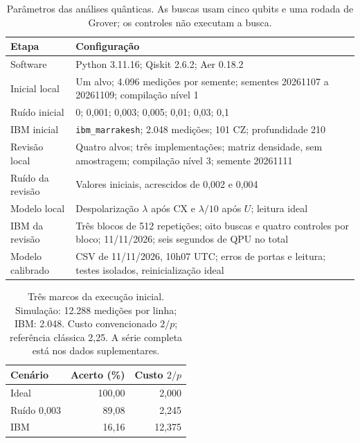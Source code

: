 \begin{table}[!ht]
\caption{Parâmetros das análises quânticas. As buscas usam cinco qubits e uma rodada de Grover; os controles não executam a busca.}
\label{tab:parametros}
\centering\small
\begin{tabularx}{\columnwidth}{@{}lX@{}}
\toprule
Etapa & Configuração \\
\midrule
Software & Python 3.11.16; Qiskit 2.6.2; Aer 0.18.2 \\
Inicial local & Um alvo; 4.096 medições por semente; sementes 20261107 a 20261109; compilação nível 1 \\
Ruído inicial & 0; 0,001; 0,003; 0,005; 0,01; 0,03; 0,1 \\
IBM inicial & \texttt{ibm\_marrakesh}; 2.048 medições; 101 CZ; profundidade 210 \\
Revisão local & Quatro alvos; três implementações; matriz densidade, sem amostragem; compilação nível 3; semente 20261111 \\
Ruído da revisão & Valores iniciais, acrescidos de 0,002 e 0,004 \\
Modelo local & Despolarização $\lambda$ após CX e $\lambda/10$ após $U$; leitura ideal \\
IBM da revisão & Três blocos de 512 repetições; oito buscas e quatro controles por bloco; 11/11/2026; seis segundos de QPU no total \\
Modelo calibrado & CSV de 11/11/2026, 10h07 UTC; erros de portas e leitura; testes isolados, reinicialização ideal \\
\bottomrule
\end{tabularx}
\end{table}

\begin{table}[!ht]
\caption{Três marcos da execução inicial. Simulação: 12.288 medições por linha; IBM: 2.048. Custo convencionado $2/p$; referência clássica 2,25. A série completa está nos dados suplementares.}
\label{tab:experimento}
\centering\small
\begin{tabular}{@{}lrr@{}}
\toprule
Cenário & Acerto (\%) & Custo $2/p$ \\
\midrule
Ideal & 100,00 & 2,000 \\
Ruído 0,003 & 89,08 & 2,245 \\
IBM & 16,16 & 12,375 \\
\bottomrule
\end{tabular}
\end{table}

